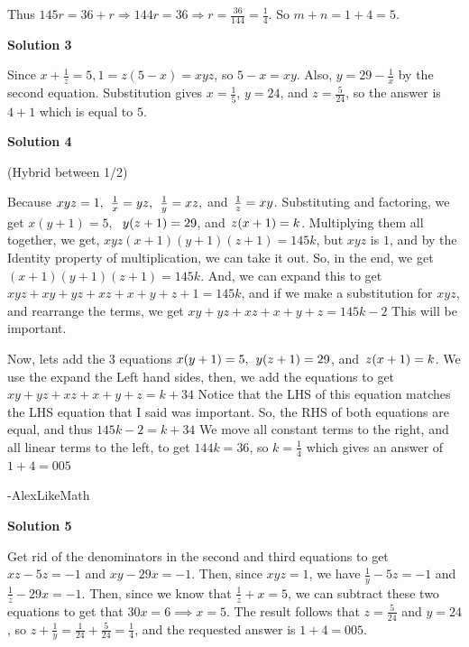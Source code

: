 \begin{enumerate}
 Thus $145r = 36+r \Rightarrow 144r = 36 \Rightarrow r = \frac{36}{144} = \frac{1}{4}$. So $m + n = 1 + 4 = \boxed{5}$.

 



\textbf{Solution 3}

Since $x+\frac{1}{z}=5, 1=z(5-x)=xyz$, so $5-x=xy$. Also, $y=29-\frac{1}{x}$ by the second equation. Substitution gives $x=\frac{1}{5}$, $y=24$, and $z=\frac{5}{24}$, so the answer is $4+1$ which is equal to $5$.

 



\textbf{Solution 4}

(Hybrid between 1/2)

 Because $xyz = 1, \hspace{0.15cm} \frac{1}{x} = yz, \hspace{0.15cm} \frac{1}{y} = xz,$ and $\hspace{0.05cm}\frac{1}{z} = xy$. Substituting and factoring, we get $x(y+1) = 5$, $\hspace{0.15cm}y(z+1) = 29$, and $\hspace{0.05cm}z(x+1) = k$. Multiplying them all together, we get, $xyz(x+1)(y+1)(z+1) = 145k$, but $xyz$ is $1$, and by the Identity property of multiplication, we can take it out. So, in the end, we get $(x+1)(y+1)(z+1) = 145k$. And, we can expand this to get $xyz+xy+yz+xz+x+y+z+1 = 145k$, and if we make a substitution for $xyz$, and rearrange the terms, we get $xy+yz+xz+x+y+z = 145k-2$ This will be important.

 
Now, lets add the 3 equations $x(y+1) = 5, \hspace{0.15cm}y(z+1) = 29$, and $\hspace{0.05cm}z(x+1) = k$. We use the expand the Left hand sides, then, we add the equations to get $xy+yz+xz+x+y+z = k+34$ Notice that the LHS of this equation matches the LHS equation that I said was important. So, the RHS of both equations are equal, and thus $145k-2 = k+34$ We move all constant terms to the right, and all linear terms to the left, to get $144k = 36$, so $k = \frac{1}{4}$ which gives an answer of $1+4 = \boxed{005}$

 -AlexLikeMath

 



\textbf{Solution 5}

Get rid of the denominators in the second and third equations to get $xz-5z=-1$ and $xy-29x=-1$. Then, since $xyz=1$, we have $\frac 1y-5z=-1$ and $\frac 1z-29x=-1$. Then, since we know that $\frac 1z+x=5$, we can subtract these two equations to get that $30x=6\implies x=5$. The result follows that $z=\frac 5{24}$ and $y=24$, so $z+\frac 1y=\frac 1{24}+\frac 5{24}=\frac 14$, and the requested answer is $1+4=\boxed{005}.$





\end{enumerate}
